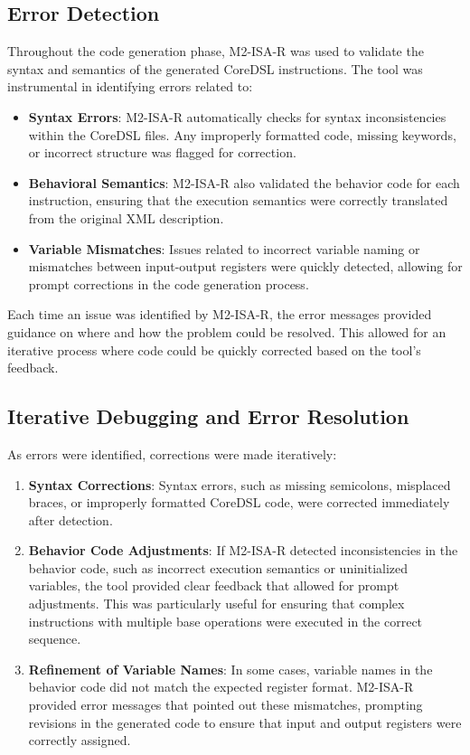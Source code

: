 \subsection{Error Detection}

Throughout the code generation phase, M2-ISA-R was used to validate the syntax and semantics of the generated CoreDSL instructions. The tool was instrumental in identifying errors related to:

\begin{itemize}
    \item \textbf{Syntax Errors}: M2-ISA-R automatically checks for syntax inconsistencies within the CoreDSL files. Any improperly formatted code, missing keywords, or incorrect structure was flagged for correction.
    \item \textbf{Behavioral Semantics}: M2-ISA-R also validated the behavior code for each instruction, ensuring that the execution semantics were correctly translated from the original XML description.
    \item \textbf{Variable Mismatches}: Issues related to incorrect variable naming or mismatches between input-output registers were quickly detected, allowing for prompt corrections in the code generation process.
\end{itemize}

Each time an issue was identified by M2-ISA-R, the error messages provided guidance on where and how the problem could be resolved. This allowed for an iterative process where code could be quickly corrected based on the tool's feedback.

\subsection{Iterative Debugging and Error Resolution}

As errors were identified, corrections were made iteratively:

\begin{enumerate}
    \item \textbf{Syntax Corrections}: Syntax errors, such as missing semicolons, misplaced braces, or improperly formatted CoreDSL code, were corrected immediately after detection.
    \item \textbf{Behavior Code Adjustments}: If M2-ISA-R detected inconsistencies in the behavior code, such as incorrect execution semantics or uninitialized variables, the tool provided clear feedback that allowed for prompt adjustments. This was particularly useful for ensuring that complex instructions with multiple base operations were executed in the correct sequence.
    \item \textbf{Refinement of Variable Names}: In some cases, variable names in the behavior code did not match the expected register format. M2-ISA-R provided error messages that pointed out these mismatches, prompting revisions in the generated code to ensure that input and output registers were correctly assigned.
\end{enumerate}

